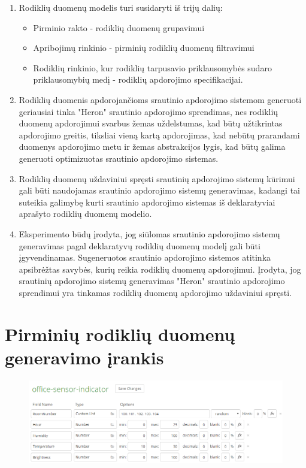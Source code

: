 \documentclass{VUMIFPSbakalaurinis}
\begin{document}
\begin{enumerate}
    \item Rodiklių duomenų modelis turi susidaryti iš trijų dalių:
    \begin{itemize}
        \item Pirminio rakto - rodiklių duomenų grupavimui
        \item Apribojimų rinkinio - pirminių rodiklių duomenų filtravimui
        \item Rodiklių rinkinio, kur rodiklių tarpusavio priklausomybės sudaro priklausomybių medį - rodiklių apdorojimo specifikacijai.
    \end{itemize}
    \item Rodiklių duomenis apdorojančioms srautinio apdorojimo sistemom generuoti geriausiai tinka "Heron" srautinio apdorojimo sprendimas, nes rodiklių duomenų apdorojimui svarbus žemas uždelstumas, kad būtų užtikrintas apdorojimo greitis, tiksliai vieną kartą apdorojimas, kad nebūtų prarandami duomenys apdorojimo metu ir žemas abstrakcijos lygis, kad būtų galima generuoti optimizuotas srautinio apdorojimo sistemas.
    \item Rodiklių duomenų uždaviniui spręsti srautinių apdorojimo sistemų kūrimui gali būti naudojamas srautinio apdorojimo sistemų generavimas, kadangi tai suteikia galimybę kurti srautinio apdorojimo sistemas iš deklaratyviai aprašyto rodiklių duomenų modelio.
    \item Eksperimento būdų įrodyta, jog siūlomas srautinio apdorojimo sistemų generavimas pagal deklaratyvų rodiklių duomenų modelį gali būti įgyvendinamas. Sugeneruotos srautinio apdorojimo sistemos atitinka apsibrėžtas savybės, kurių reikia rodiklių duomenų apdorojimui. Įrodyta, jog srautinių apdorojimo sistemų generavimas "Heron" srautinio apdorojimo sprendimui yra tinkamas rodiklių duomenų apdorojimo uždaviniui spręsti.  
\end{enumerate}

\printbibliography[heading=bibintoc] 

\appendix 

\section{Pirminių rodiklių duomenų generavimo įrankis}\label{add:mockaroo}
\begin{figure}[H]
    \centering
    \includegraphics[width=1\textwidth]{img/generated-data.png}
    \label{img:generated-data}
\end{figure}
\end{document}
